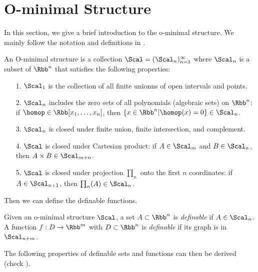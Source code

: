 

\section{O-minimal Structure} \label{sec:o-minimal}

In this section, we give a brief introduction to the o-minimal structure. We mainly follow the notation and definitions in \citet{ji2020directional}.

\begin{definition}
\label{def:O-minimal structure}
An O-minimal structure is a collection $\Scal = (\Scal_n)_{n=1}^\infty$ where $\Scal_n$ is a subset of $\Rbb^n$ that satisfies the following properties:
\begin{itemize}
    \item [1.] $ \Scal_1 $ is the collection of all finite unionns of open intervals and points. 
    \item [2.] $ \Scal_n $ includes the zero sets of all polynomials (algebraic sets) on $\Rbb^n$: if $\homop \in \Rbb[x_1,\ldots ,x_n] $, then $\{ x \in \Rbb^n | \homop(x) = 0 \} \in \Scal_n$. 
    \item [3.] $ \Scal_n $ is closed under finite union, finite intersection,  and complement.  
    \item [4.] $ \Scal $ is closed under Cartesian product: if $A \in \Scal_m$ and $B \in \Scal_n$, then $A \times B \in \Scal_{m+n}$.
    \item [5.] $ \Scal $ is closed under projection  $ \prod_n $ onto the first $ n $ coordinates: if $ A \in \Scal_{n+1} $, then $ \prod_n(A) \in \Scal_n $. 
\end{itemize}
\end{definition}

Then we can define the definable functions.


\begin{definition}
\label{def:Definable sets and functions}
Given an o-minimal structure $\Scal$, a set $A \subset \Rbb^n$ is \emph{definable} if $A \in \Scal_n$. A function $f: D \to \Rbb^m$ with $D \subset \Rbb^n$ is \emph{definable} if its graph is in $\Scal_{n+m}$.
\end{definition}


The following properties of definable sets and functions can then be derived (check \citet{coste2000introduction,loi2010lecture,van1996geometric}).



